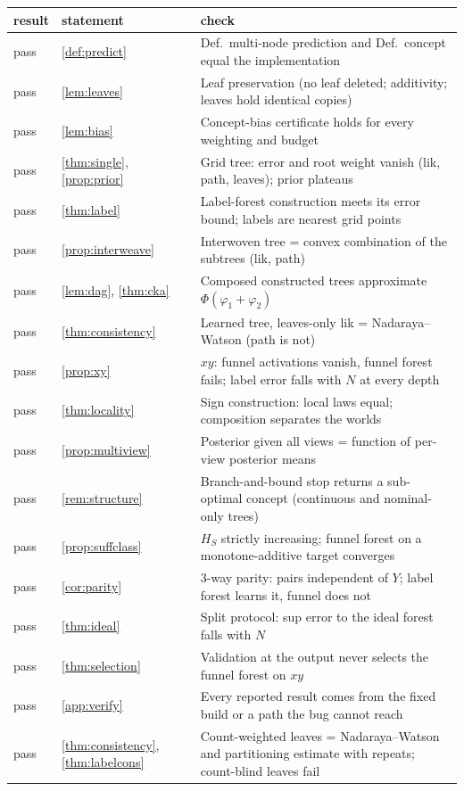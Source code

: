 \begin{tabular}{@{}llp{9.2cm}@{}}\toprule
result & statement & check\\\midrule
pass & \cref{def:predict} & Def.~multi-node prediction and Def.~concept equal the implementation\\
pass & \cref{lem:leaves} & Leaf preservation (no leaf deleted; additivity; leaves hold identical copies)\\
pass & \cref{lem:bias} & Concept-bias certificate holds for every weighting and budget\\
pass & \cref{thm:single}, \cref{prop:prior} & Grid tree: error and root weight vanish (lik, path, leaves); prior plateaus\\
pass & \cref{thm:label} & Label-forest construction meets its error bound; labels are nearest grid points\\
pass & \cref{prop:interweave} & Interwoven tree = convex combination of the subtrees (lik, path)\\
pass & \cref{lem:dag}, \cref{thm:cka} & Composed constructed trees approximate $\Phi(\varphi_1+\varphi_2)$\\
pass & \cref{thm:consistency} & Learned tree, leaves-only lik = Nadaraya--Watson (path is not)\\
pass & \cref{prop:xy} & $xy$: funnel activations vanish, funnel forest fails; label error falls with $N$ at every depth\\
pass & \cref{thm:locality} & Sign construction: local laws equal; composition separates the worlds\\
pass & \cref{prop:multiview} & Posterior given all views = function of per-view posterior means\\
pass & \cref{rem:structure} & Branch-and-bound stop returns a sub-optimal concept (continuous and nominal-only trees)\\
pass & \cref{prop:suffclass} & $H_S$ strictly increasing; funnel forest on a monotone-additive target converges\\
pass & \cref{cor:parity} & 3-way parity: pairs independent of $Y$; label forest learns it, funnel does not\\
pass & \cref{thm:ideal} & Split protocol: sup error to the ideal forest falls with $N$\\
pass & \cref{thm:selection} & Validation at the output never selects the funnel forest on $xy$\\
pass & \cref{app:verify} & Every reported result comes from the fixed build or a path the bug cannot reach\\
pass & \cref{thm:consistency}, \cref{thm:labelcons} & Count-weighted leaves = Nadaraya--Watson and partitioning estimate with repeats; count-blind leaves fail\\
\bottomrule\end{tabular}